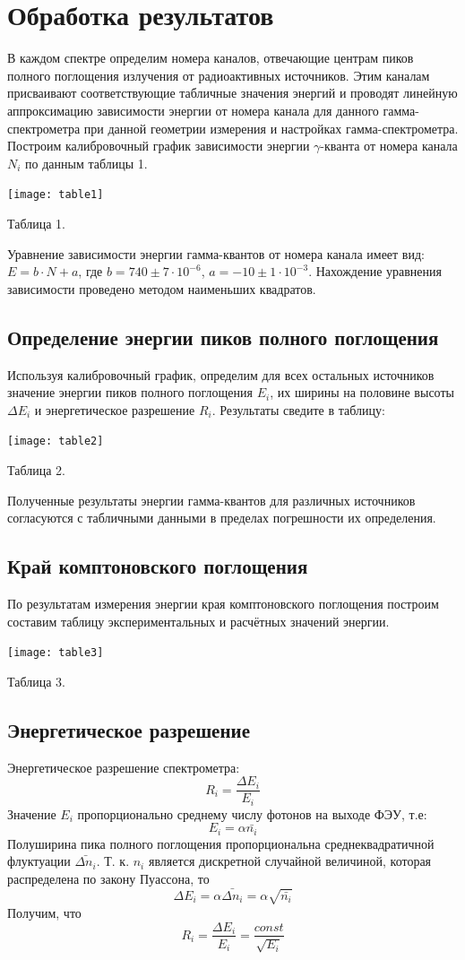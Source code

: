 \documentclass[a4paper,12pt]{article} %
\begin{document}
\section*{Обработка результатов}
В каждом спектре определим номера каналов, отвечающие центрам пиков полного поглощения излучения от радиоактивных источников. Этим каналам присваивают соответствующие табличные значения энергий и проводят линейную аппроксимацию зависимости энергии от номера канала для данного гамма-спектрометра при данной геометрии измерения и настройках гамма-спектрометра. Построим калибровочный график зависимости энергии $\gamma$-кванта от номера канала $N_i$ по данным таблицы 1.
\begin{center}
\texttt{[image: table1]}

Таблица 1.
\end{center}
Уравнение зависимости энергии гамма-квантов от номера канала имеет вид: $E=b\cdot N+a$, где $b=740\pm7\cdot 10^{-6}$, $a=-10\pm 1 \cdot 10^{-3}$.	Нахождение уравнения зависимости проведено методом наименьших квадратов. 

\subsection*{Определение энергии пиков полного поглощения}

Используя калибровочный график, определим для всех остальных источников значение энергии пиков полного поглощения $E_i$, их ширины на половине высоты $\Delta E_i$ и энергетическое разрешение $R_i$. Результаты сведите в таблицу:
\begin{center}
\texttt{[image: table2]}

Таблица 2.
\end{center}
Полученные результаты энергии гамма-квантов для различных источников согласуются с табличными данными в пределах погрешности их определения.

\subsection*{Край комптоновского поглощения}
По результатам измерения энергии края комптоновского поглощения построим составим таблицу экспериментальных и расчётных значений энергии.
\begin{center}
\texttt{[image: table3]}

Таблица 3.
\end{center}

\subsection*{Энергетическое разрешение}
Энергетическое разрешение спектрометра:
\[R_i=\frac{\Delta E_i}{E_i}\]
Значение $E_i$ пропорционально среднему числу фотонов на выходе ФЭУ, т.е:
\[E_i=\alpha \bar{n_i}\]
Полуширина пика полного поглощения пропорциональна среднеквадратичной флуктуации $\bar{\Delta n_i}$. Т. к. $n_i$ является дискретной случайной величиной, которая распределена по закону Пуассона, то
\[\Delta E_i = \alpha \bar{\Delta n_i} = \alpha \sqrt{\bar{n_i}}\]
Получим, что
\begin{equation}
R_i = \frac{\Delta E_i}{E_i} = \frac{const}{\sqrt{E_i}}
\end{equation}
\end{document}
